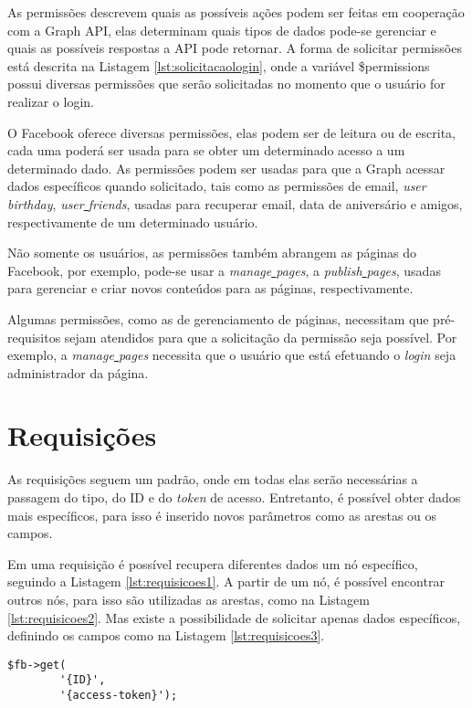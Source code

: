 As permissões descrevem quais as possíveis ações podem ser feitas em cooperação com a Graph API, elas determinam quais tipos de dados pode-se gerenciar e quais as possíveis respostas a API pode retornar. A forma de solicitar permissões está descrita na Listagem \ref{lst:solicitacaologin}, onde a variável \$permissions possui diversas permissões que serão solicitadas no momento que o usuário for realizar o login.

O Facebook oferece diversas permissões, elas podem ser de leitura ou de escrita, cada uma poderá ser usada para se obter um determinado acesso a um determinado dado. As permissões podem ser usadas para que a Graph acessar dados específicos quando solicitado, tais como as permissões de email, \textit{user\underline{{ }}birthday}, \textit{user\underline{{ }}friends}, usadas para recuperar email, data de aniversário e amigos, respectivamente de um determinado usuário.

Não somente os usuários, as permissões também abrangem as páginas do Facebook, por exemplo, pode-se usar a \textit{manage\underline{{ }}pages}, a \textit{publish\underline{{ }}pages}, usadas para gerenciar e criar novos conteúdos para as páginas, respectivamente.

Algumas permissões, como as de gerenciamento de páginas, necessitam que pré-requisitos sejam atendidos para que a solicitação da permissão seja possível. Por exemplo, a \textit{manage\underline{{ }}pages} necessita que o usuário que está efetuando o \textit{login} seja administrador da página.

\section{Requisições}
As requisições seguem um padrão, onde em todas elas serão necessárias a passagem do tipo, do ID e do \textit{token} de acesso. Entretanto, é possível obter dados mais específicos, para isso é inserido novos parâmetros como as arestas ou os campos. 

Em uma requisição é possível recupera diferentes dados um nó específico, seguindo a Listagem \ref{lst:requisicoes1}. A partir de um nó, é possível encontrar outros nós, para isso são utilizadas as arestas, como na Listagem \ref{lst:requisicoes2}. Mas existe a possibilidade de solicitar apenas dados específicos, definindo os campos como na Listagem \ref{lst:requisicoes3}.  

\begin{lstlisting}[caption={Requisição com o uso do ID},label={lst:requisicoes1}]
	$fb->get(
    	'{ID}',
    	'{access-token}');
\end{lstlisting}

